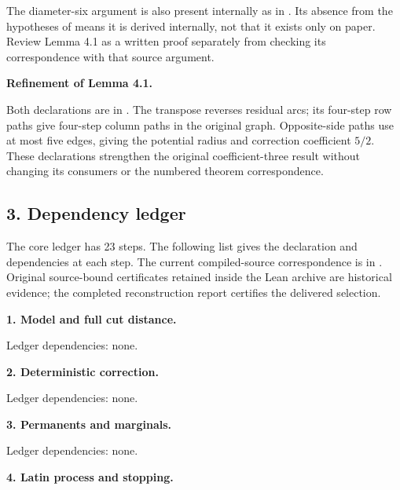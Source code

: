 \documentclass[english,11pt,a4paper]{article}
\newcounter{none}
\begin{document}
The diameter-six argument is also present internally as  in . Its absence from the hypotheses of  means it is derived internally, not that it exists only on paper. Review Lemma 4.1 as a written proof separately from checking its correspondence with that source argument.

\textbf{Refinement of Lemma 4.1.}



Both declarations are in . The transpose reverses residual arcs; its four-step row paths give four-step column paths in the original graph. Opposite-side paths use at most five edges, giving the potential radius and correction coefficient \(5/2\). These declarations strengthen the original coefficient-three result without changing its consumers or the numbered theorem correspondence.

\subsection{3. Dependency ledger}\label{dependency-ledger}

The core ledger has 23 steps. The following list gives the declaration and dependencies at each step. The current compiled-source correspondence is in . Original source-bound certificates retained inside the Lean archive are historical evidence; the completed reconstruction report certifies the delivered selection.

\textbf{1. Model and full cut distance.}


Ledger dependencies: none.

\textbf{2. Deterministic correction.}


Ledger dependencies: none.

\textbf{3. Permanents and marginals.}


Ledger dependencies: none.

\textbf{4. Latin process and stopping.}
\end{document}
